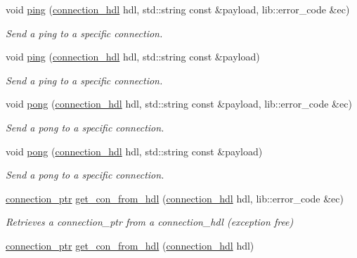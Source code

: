 \begin{DoxyCompactItemize}
\item 
void \hyperlink{classwebsocketpp_1_1endpoint_a1d4bcbc3fcd87f48120fbb421467f414}{ping} (\hyperlink{namespacewebsocketpp_a6b3d26a10ee7229b84b776786332631d}{connection\+\_\+hdl} hdl, std\+::string const \&payload, lib\+::error\+\_\+code \&ec)
\begin{DoxyCompactList}\small\item\em Send a ping to a specific connection. \end{DoxyCompactList}\item 
void \hyperlink{classwebsocketpp_1_1endpoint_a35267939caf4b611b01701ba13cd0b33}{ping} (\hyperlink{namespacewebsocketpp_a6b3d26a10ee7229b84b776786332631d}{connection\+\_\+hdl} hdl, std\+::string const \&payload)
\begin{DoxyCompactList}\small\item\em Send a ping to a specific connection. \end{DoxyCompactList}\item 
void \hyperlink{classwebsocketpp_1_1endpoint_a58a55e0288d4da518b2a806587df3809}{pong} (\hyperlink{namespacewebsocketpp_a6b3d26a10ee7229b84b776786332631d}{connection\+\_\+hdl} hdl, std\+::string const \&payload, lib\+::error\+\_\+code \&ec)
\begin{DoxyCompactList}\small\item\em Send a pong to a specific connection. \end{DoxyCompactList}\item 
void \hyperlink{classwebsocketpp_1_1endpoint_ab546cb4089f868a09c8d0694fb6f0be6}{pong} (\hyperlink{namespacewebsocketpp_a6b3d26a10ee7229b84b776786332631d}{connection\+\_\+hdl} hdl, std\+::string const \&payload)
\begin{DoxyCompactList}\small\item\em Send a pong to a specific connection. \end{DoxyCompactList}\item 
\hyperlink{classwebsocketpp_1_1endpoint_aa90d289d870c500be228ee1dea75b8b2}{connection\+\_\+ptr} \hyperlink{classwebsocketpp_1_1endpoint_a0fe4457427d4124abe7ca022ba7afbb4}{get\+\_\+con\+\_\+from\+\_\+hdl} (\hyperlink{namespacewebsocketpp_a6b3d26a10ee7229b84b776786332631d}{connection\+\_\+hdl} hdl, lib\+::error\+\_\+code \&ec)
\begin{DoxyCompactList}\small\item\em Retrieves a connection\+\_\+ptr from a connection\+\_\+hdl (exception free) \end{DoxyCompactList}\item 
\hyperlink{classwebsocketpp_1_1endpoint_aa90d289d870c500be228ee1dea75b8b2}{connection\+\_\+ptr} \hyperlink{classwebsocketpp_1_1endpoint_a7be6f2e7dc3901dd577eae33dfd2df24}{get\+\_\+con\+\_\+from\+\_\+hdl} (\hyperlink{namespacewebsocketpp_a6b3d26a10ee7229b84b776786332631d}{connection\+\_\+hdl} hdl)\hypertarget{classwebsocketpp_1_1endpoint_a7be6f2e7dc3901dd577eae33dfd2df24}{}\label{classwebsocketpp_1_1endpoint_a7be6f2e7dc3901dd577eae33dfd2df24}


\end{DoxyCompactItemize}

